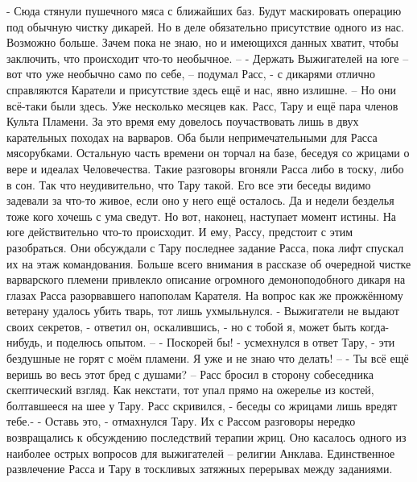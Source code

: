 \documentclass[a4paper, 12pt]{report}
\begin{document}
	- Сюда стянули пушечного мяса с ближайших баз. Будут маскировать операцию под обычную чистку дикарей. Но в деле обязательно присутствие одного из нас. Возможно больше. Зачем пока не знаю, но и имеющихся данных хватит, чтобы заключить, что происходит что-то необычное. –
	- Держать Выжигателей на юге – вот что уже необычно само по себе, – подумал Расс, - с дикарями отлично справляются Каратели и присутствие здесь ещё и нас, явно излишне. –
Но они всё-таки были здесь. Уже несколько месяцев как. Расс, Тару и ещё пара членов Культа Пламени. За это время ему довелось поучаствовать лишь в двух карательных походах на варваров. Оба были непримечательными для Расса мясорубками. Остальную часть времени он торчал на базе, беседуя со жрицами о вере и идеалах Человечества. Такие разговоры вгоняли Расса либо в тоску, либо в сон. Так что неудивительно, что Тару такой. Его все эти беседы видимо задевали за что-то живое, если оно у него ещё осталось. Да и недели безделья тоже кого хочешь с ума сведут. 
Но вот, наконец, наступает момент истины. 
На юге действительно что-то происходит. И ему, Рассу, предстоит с этим разобраться.
Они обсуждали с Тару последнее задание Расса, пока лифт спускал их на этаж командования. Больше всего внимания в рассказе об очередной чистке варварского племени привлекло описание огромного демоноподобного дикаря на глазах Расса разорвавшего напополам Карателя. На вопрос как же прожжённому ветерану удалось убить тварь, тот лишь ухмыльнулся.
- Выжигатели не выдают своих секретов, - ответил он, оскалившись, - но с тобой я, может быть когда-нибудь, и поделюсь опытом. –
- Поскорей бы! - усмехнулся в ответ Тару, - эти бездушные не горят с моём пламени. Я уже и не знаю что делать! –
- Ты всё ещё веришь во весь этот бред с душами? – Расс бросил в сторону собеседника скептический взгляд. Как некстати, тот упал прямо на ожерелье из костей, болтавшееся на шее у Тару. Расс скривился, - беседы со жрицами лишь вредят тебе.-
- Оставь это, -  отмахнулся Тару. Их с Рассом разговоры нередко возвращались к обсуждению последствий терапии жриц. Оно касалось одного из наиболее острых вопросов для выжигателей – религии Анклава. Единственное развлечение Расса и Тару в тоскливых затяжных перерывах между заданиями. 
\end{document}
